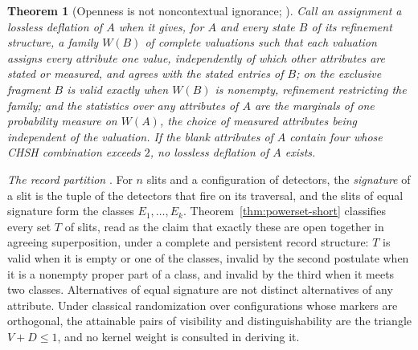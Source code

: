 \documentclass[11pt]{article}
\newtheorem{theorem}{Theorem}
\theoremstyle{definition}
\begin{document}
\begin{theorem}[Openness is not noncontextual ignorance; \cite{AethusRealist, AethusQuant, Aethus}]\label{thm:core_deflation}
Call an assignment a \emph{lossless deflation} of $A$ when it gives, for $A$ and every state $B$ of its refinement structure, a family $W(B)$ of complete valuations such that each valuation assigns every attribute one value, independently of which other attributes are stated or measured, and agrees with the stated entries of $B$; on the exclusive fragment $B$ is valid exactly when $W(B)$ is nonempty, refinement restricting the family; and the statistics over any attributes of $A$ are the marginals of one probability measure on $W(A)$, the choice of measured attributes being independent of the valuation. If the blank attributes of $A$ contain four whose CHSH combination exceeds $2$, no lossless deflation of $A$ exists.
\end{theorem}

\noindent \emph{The record partition} \cite{AethusQuant, Aethus}. For $n$ slits and a configuration of detectors, the \emph{signature} of a slit is the tuple of the detectors that fire on its traversal, and the slits of equal signature form the classes $E_1, \ldots, E_k$. Theorem~\ref{thm:powerset-short} classifies every set $T$ of slits, read as the claim that exactly these are open together in agreeing superposition, under a complete and persistent record structure: $T$ is valid when it is empty or one of the classes, invalid by the second postulate when it is a nonempty proper part of a class, and invalid by the third when it meets two classes. Alternatives of equal signature are not distinct alternatives of any attribute. Under classical randomization over configurations whose markers are orthogonal, the attainable pairs of visibility and distinguishability are the triangle $V + D \le 1$, and no kernel weight is consulted in deriving it.
\end{document}
